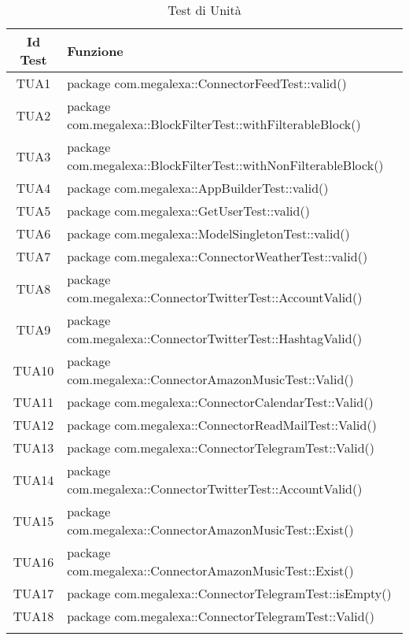 \normalsize
\begin{longtable}{|c|m{28em}|}
	\hline 
	\textbf{Id Test} & \textbf{Funzione}\\
	\hline
	\endhead
	TUA1 & package com.megalexa::ConnectorFeedTest::valid() \\ \hline
	TUA2 & package com.megalexa::BlockFilterTest::withFilterableBlock() \\ \hline
	TUA3 & package com.megalexa::BlockFilterTest::withNonFilterableBlock() \\ \hline
	TUA4 & package com.megalexa::AppBuilderTest::valid() \\ \hline
	TUA5 & package com.megalexa::GetUserTest::valid() \\ \hline
	TUA6 & package com.megalexa::ModelSingletonTest::valid() \\ \hline
	TUA7 & package com.megalexa::ConnectorWeatherTest::valid()\\ \hline
	TUA8 & package com.megalexa::ConnectorTwitterTest::AccountValid() \\ \hline
	TUA9 & package com.megalexa::ConnectorTwitterTest::HashtagValid()\\ \hline
	TUA10 & package com.megalexa::ConnectorAmazonMusicTest::Valid()\\ \hline
	TUA11 & package com.megalexa::ConnectorCalendarTest::Valid() \\ \hline
	TUA12 & package com.megalexa::ConnectorReadMailTest::Valid() \\ \hline
	TUA13 & package com.megalexa::ConnectorTelegramTest::Valid()\\ \hline
	TUA14 & package com.megalexa::ConnectorTwitterTest::AccountValid() \\ \hline
	TUA15 & package com.megalexa::ConnectorAmazonMusicTest::Exist()\\ \hline
	TUA16 & package com.megalexa::ConnectorAmazonMusicTest::Exist()\\ \hline
	TUA17 & package com.megalexa::ConnectorTelegramTest::isEmpty()\\ \hline
	TUA18 & package com.megalexa::ConnectorTelegramTest::Valid()\\ \hline
	\caption[Test di Unità]{Test di Unità}
	\label{tabella:test2}
\end{longtable}
\clearpage
